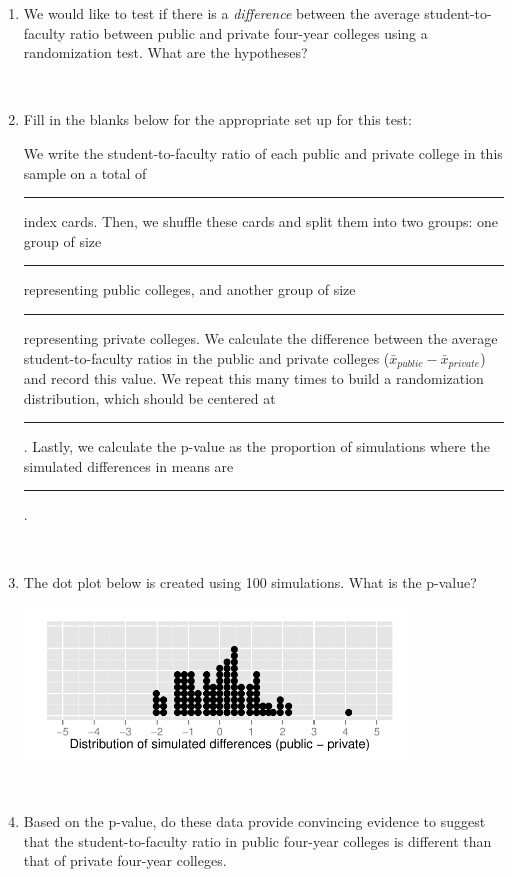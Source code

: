 \documentclass[12pt]{article}
\newcommand{\soln}[2]{$\:$\\ \vspace{#1}}{}
\begin{document}
\begin{enumerate}

\item We would like to test if there is a \emph{difference} between the average student-to-faculty ratio between public and private four-year colleges using a randomization test. What are the hypotheses?

\soln{0.5cm}{$H_0: \mu_{public} = \mu_{private}$; $H_0: \mu_{public} \ne \mu_{private}$}

\item Fill in the blanks below for the appropriate set up for this test:

\begin{doublespace}
We write the student-to-faculty ratio of each public and private college in this sample on a total of \rule{2cm}{0.5pt} index cards. Then, we shuffle these cards and split them into two groups: one group of size \rule{2cm}{0.5pt} representing public colleges, and another group of size \rule{2cm}{0.5pt} representing private colleges. We calculate the difference between the average student-to-faculty ratios in the public and private colleges ($\bar{x}_{public} - \bar{x}_{private}$) and record this value. We repeat this many times to build a randomization distribution, which should be centered at \rule{2cm}{0.5pt} . Lastly, we calculate the p-value as the proportion of simulations where the simulated differences in means are \rule{5cm}{0.5pt}.
\end{doublespace}

\soln{0cm}{142, 57, 85, 0, -4 or less or 4 or more}

\item The dot plot below is created using 100 simulations. What is the p-value?

\begin{center}
\includegraphics[width=0.8\textwidth]{ratio/rand_dist_dot.pdf}
\end{center}

\soln{0.2cm}{Since only one observation is below -4 or above 4, p-value = 1 / 100 = 0.01.}

\item Based on the p-value, do these data provide convincing evidence to suggest that the student-to-faculty ratio in public four-year colleges is different than that of private four-year colleges.

\soln{1cm}{Yes, p-value is small (less than 0.05), hence we reject the null hypothesis. The data provide convincing evidence that the average student-to-faculty ratio is different for private and public colleges.}

\end{enumerate}
\end{document}
